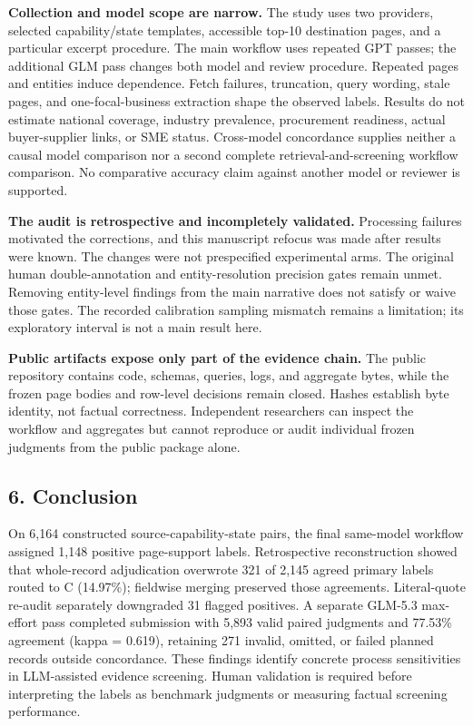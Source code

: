 \documentclass[10pt]{article}
\begin{document}
\textbf{Collection and model scope are narrow.} The study uses two providers, selected capability/state templates, accessible top-10 destination pages, and a particular excerpt procedure. The main workflow uses repeated GPT passes; the additional GLM pass changes both model and review procedure. Repeated pages and entities induce dependence. Fetch failures, truncation, query wording, stale pages, and one-focal-business extraction shape the observed labels. Results do not estimate national coverage, industry prevalence, procurement readiness, actual buyer-supplier links, or SME status. Cross-model concordance supplies neither a causal model comparison nor a second complete retrieval-and-screening workflow comparison. No comparative accuracy claim against another model or reviewer is supported.

\textbf{The audit is retrospective and incompletely validated.} Processing failures motivated the corrections, and this manuscript refocus was made after results were known. The changes were not prespecified experimental arms. The original human double-annotation and entity-resolution precision gates remain unmet. Removing entity-level findings from the main narrative does not satisfy or waive those gates. The recorded calibration sampling mismatch remains a limitation; its exploratory interval is not a main result here.

\textbf{Public artifacts expose only part of the evidence chain.} The public repository contains code, schemas, queries, logs, and aggregate bytes, while the frozen page bodies and row-level decisions remain closed. Hashes establish byte identity, not factual correctness. Independent researchers can inspect the workflow and aggregates but cannot reproduce or audit individual frozen judgments from the public package alone.

\hypertarget{conclusion}{%
\subsection{6. Conclusion}\label{conclusion}}

On 6,164 constructed source-capability-state pairs, the final same-model workflow assigned 1,148 positive page-support labels. Retrospective reconstruction showed that whole-record adjudication overwrote 321 of 2,145 agreed primary labels routed to C (14.97\%); fieldwise merging preserved those agreements. Literal-quote re-audit separately downgraded 31 flagged positives. A separate GLM-5.3 max-effort pass completed submission with 5,893 valid paired judgments and 77.53\% agreement (kappa = 0.619), retaining 271 invalid, omitted, or failed planned records outside concordance. These findings identify concrete process sensitivities in LLM-assisted evidence screening. Human validation is required before interpreting the labels as benchmark judgments or measuring factual screening performance.
\end{document}
